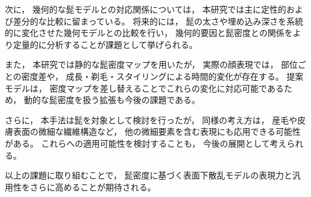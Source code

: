 次に，
幾何的な髭モデルとの対応関係については，
本研究では主に定性的および差分的な比較に留まっている。
将来的には，
髭の太さや埋め込み深さを系統的に変化させた幾何モデルとの比較を行い，
幾何的要因と髭密度との関係をより定量的に分析することが課題として挙げられる。

また，
本研究では静的な髭密度マップを用いたが，
実際の顔表現では，
部位ごとの密度差や，
成長・剃毛・スタイリングによる時間的変化が存在する。
提案モデルは，
密度マップを差し替えることでこれらの変化に対応可能であるため，
動的な髭密度を扱う拡張も今後の課題である。

さらに，
本手法は髭を対象として検討を行ったが，
同様の考え方は，
産毛や皮膚表面の微細な繊維構造など，
他の微細要素を含む表現にも応用できる可能性がある。
これらへの適用可能性を検討することも，
今後の展開として考えられる。

以上の課題に取り組むことで，
髭密度に基づく表面下散乱モデルの表現力と汎用性をさらに高めることが期待される。

